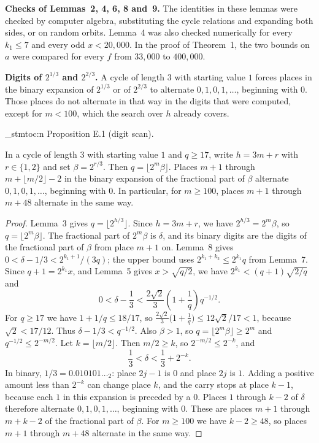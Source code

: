 \documentclass[11pt]{article}
\newenvironment{named}[1]{%
  \par\addvspace{\medskipamount}%
  \pagebreak[3]%
  \noindent{\bfseries #1}\space\ignorespaces
  \stmtoc{#1}%
}{\par\addvspace{\medskipamount}}
\newcommand{\topic}[1]{\par\noindent\textbf{#1}}
\newcommand{\stmtoc}[1]{ \qn_stmtoc:n {#1} }
\begin{document}
\topic{Checks of Lemmas~2, 4, 6, 8 and~9.}
The identities in these lemmas were checked by computer algebra, substituting the cycle relations and expanding both sides, or on random orbits.
Lemma~4 was also checked numerically for every $k_1 \le 7$ and every odd $x < 20{,}000$.
In the proof of Theorem~1, the two bounds on $a$ were compared for every $f$ from $33{,}000$ to $400{,}000$.

\topic{Digits of $2^{1/3}$ and $2^{2/3}$.}
A cycle of length $3$ with starting value $1$ forces places in the binary expansion of $2^{1/3}$ or of $2^{2/3}$ to alternate $0, 1, 0, 1, \ldots$, beginning with $0$.
Those places do not alternate in that way in the digits that were computed, except for $m < 100$, which the search over $h$ already covers.

\begin{named}{Proposition E.1 (digit scan).}
In a cycle of length $3$ with starting value $1$ and $q \ge 17$, write $h = 3m + r$ with $r \in \{1, 2\}$ and set $\beta = 2^{r/3}$.
Then $q = \lfloor 2^m \beta \rfloor$.
Places $m+1$ through $m + \lfloor m/2 \rfloor - 2$ in the binary expansion of the fractional part of $\beta$ alternate $0, 1, 0, 1, \ldots$, beginning with $0$.
In particular, for $m \ge 100$, places $m+1$ through $m+48$ alternate in the same way.
\end{named}

\begin{proof}
Lemma~3 gives $q = \lfloor 2^{h/3} \rfloor$.
Since $h = 3m + r$, we have $2^{h/3} = 2^m \beta$, so $q = \lfloor 2^m \beta \rfloor$.
The fractional part of $2^m \beta$ is $\delta$, and its binary digits are the digits of the fractional part of $\beta$ from place $m+1$ on.
Lemma~8 gives $0 < \delta - 1/3 < 2^{k_1+1}/(3q)$; the upper bound uses $2^{k_1+k_2} \le 2^{k_1} q$ from Lemma~7.
Since $q + 1 = 2^{k_1} x$, and Lemma~5 gives $x > \sqrt{q/2}$, we have $2^{k_1} < (q+1)\sqrt{2/q}$ and
\[
0 < \delta - \frac{1}{3} < \frac{2\sqrt{2}}{3}\left(1 + \frac{1}{q}\right) q^{-1/2}.
\]
For $q \ge 17$ we have $1 + 1/q \le 18/17$, so $\frac{2\sqrt{2}}{3}\bigl(1 + \frac{1}{q}\bigr) \le 12\sqrt{2}/17 < 1$, because $\sqrt{2} < 17/12$.
Thus $\delta - 1/3 < q^{-1/2}$.
Also $\beta > 1$, so $q = \lfloor 2^m \beta \rfloor \ge 2^m$ and $q^{-1/2} \le 2^{-m/2}$.
Let $k = \lfloor m/2 \rfloor$. Then $m/2 \ge k$, so $2^{-m/2} \le 2^{-k}$, and
\[
\frac13 < \delta < \frac13 + 2^{-k}.
\]
In binary, $1/3 = 0.010101\ldots{}_2$: place $2j-1$ is $0$ and place $2j$ is $1$.
Adding a positive amount less than $2^{-k}$ can change place $k$, and the carry stops at place $k-1$, because each $1$ in this expansion is preceded by a $0$.
Places $1$ through $k-2$ of $\delta$ therefore alternate $0, 1, 0, 1, \ldots$, beginning with $0$.
These are places $m+1$ through $m + k - 2$ of the fractional part of $\beta$.
For $m \ge 100$ we have $k - 2 \ge 48$, so places $m+1$ through $m+48$ alternate in the same way.
\end{proof}
\end{document}
